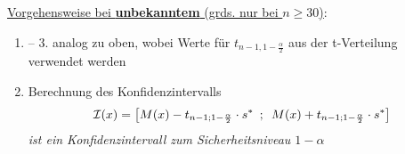 \underline{Vorgehensweise bei \textbf{unbekanntem} \boldmath{\(\sigma\)} (grds. nur bei \(n\geq 30\))}:
\begin{enumerate}
    \item -- 3. analog zu oben, wobei Werte für \(t_{n-1,1-\frac{\alpha}{2}}\) aus der t-Verteilung verwendet werden 

    \item Berechnung des Konfidenzintervalls
    \begin{equation*}
        \mathcal{I}(x) = \left[M(x) - t_{n-1;1-\frac{\alpha}{2}} \cdot s^*\hspace{0.5em}; \hspace{0.5em}M(x) + t_{n-1;1-\frac{\alpha}{2}} \cdot s
        ^*\right]
    \end{equation*}
    \emph{ist ein Konfidenzintervall zum Sicherheitsniveau \(1-\alpha\)}\\
\end{enumerate}